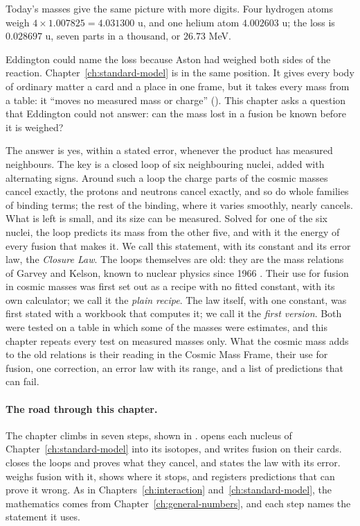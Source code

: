 Today's masses give the same picture with more digits. Four hydrogen atoms weigh $4 \times 1.007825 = 4.031300$ u, and one helium atom $4.002603$ u; the loss is $0.028697$ u, seven parts in a thousand, or $26.73$ MeV.

\bigskip

Eddington could name the loss because Aston had weighed both sides of the reaction. Chapter~\ref{ch:standard-model} is in the same position. It gives every body of ordinary matter a card and a place in one frame, but it takes every mass from a table: it \enquote{moves no measured mass or charge} (). This chapter asks a question that Eddington could not answer: can the mass lost in a fusion be known before it is weighed?

The answer is yes, within a stated error, whenever the product has measured neighbours. The key is a closed loop of six neighbouring nuclei, added with alternating signs. Around such a loop the charge parts of the cosmic masses cancel exactly, the protons and neutrons cancel exactly, and so do whole families of binding terms; the rest of the binding, where it varies smoothly, nearly cancels. What is left is small, and its size can be measured. Solved for one of the six nuclei, the loop predicts its mass from the other five, and with it the energy of every fusion that makes it. We call this statement, with its constant and its error law, the \emph{Closure Law}. The loops themselves are old: they are the mass relations of Garvey and Kelson, known to nuclear physics since 1966 \citep{GarveyKelson1966}. Their use for fusion in cosmic masses was first set out as a recipe with no fitted constant, with its own calculator; we call it the \emph{plain recipe}. The law itself, with one constant, was first stated with a workbook that computes it; we call it the \emph{first version}. Both were tested on a table in which some of the masses were estimates, and this chapter repeats every test on measured masses only. What the cosmic mass adds to the old relations is their reading in the Cosmic Mass Frame, their use for fusion, one correction, an error law with its range, and a list of predictions that can fail.

\paragraph{The road through this chapter.}
The chapter climbs in seven steps, shown in .  opens each nucleus of Chapter~\ref{ch:standard-model} into its isotopes, and  writes fusion on their cards.  closes the loops and proves what they cancel, and  states the law with its error.  weighs fusion with it,  shows where it stops, and  registers predictions that can prove it wrong. As in Chapters~\ref{ch:interaction} and~\ref{ch:standard-model}, the mathematics comes from Chapter~\ref{ch:general-numbers}, and each step names the statement it uses.


